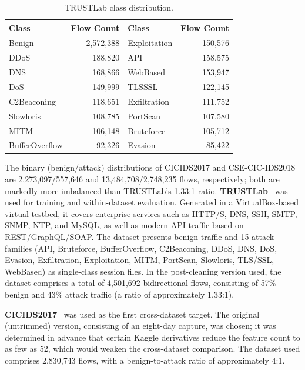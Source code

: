 \documentclass[a4paper,fleqn]{cas-sc}
\begin{document}
\begin{table}[width=.9\linewidth,cols=4,pos=htbp]
\caption{TRUSTLab class distribution.}
\label{tbl3}
\footnotesize
\begin{tabular*}{\tblwidth}{@{}LRLR@{}}
\toprule
\textbf{Class} & \textbf{Flow Count} & \textbf{Class} & \textbf{Flow Count} \\
\midrule
Benign & 2,572,388 & Exploitation & 150,576 \\
DDoS & 188,820 & API & 158,575 \\
DNS & 168,866 & WebBased & 153,947 \\
DoS & 149,999 & TLSSSL & 122,145 \\
C2Beaconing & 118,651 & Exfiltration & 111,752 \\
Slowloris & 108,785 & PortScan & 107,580 \\
MITM & 106,148 & Bruteforce & 105,712 \\
BufferOverflow & 92,326 & Evasion & 85,422 \\
\bottomrule
\end{tabular*}
\end{table}

The binary (benign/attack) distributions of CICIDS2017 and CSE-CIC-IDS2018 are 2,273,097/557,646 and 13,484,708/2,748,235 flows, respectively; both are markedly more imbalanced than TRUSTLab's 1.33:1 ratio. \textbf{TRUSTLab}~\cite{Villafranca2026} was used for training and within-dataset evaluation. Generated in a VirtualBox-based virtual testbed, it covers enterprise services such as HTTP/S, DNS, SSH, SMTP, SNMP, NTP, and MySQL, as well as modern API traffic based on REST/GraphQL/SOAP. The dataset presents benign traffic and 15 attack families (API, Bruteforce, BufferOverflow, C2Beaconing, DDoS, DNS, DoS, Evasion, Exfiltration, Exploitation, MITM, PortScan, Slowloris, TLS/SSL, WebBased) as single-class session files. In the post-cleaning version used, the dataset comprises a total of 4,501,692 bidirectional flows, consisting of 57\% benign and 43\% attack traffic (a ratio of approximately 1.33:1).

\textbf{CICIDS2017}~\cite{Sharafaldin2018} was used as the first cross-dataset target. The original (untrimmed) version, consisting of an eight-day capture, was chosen; it was determined in advance that certain Kaggle derivatives reduce the feature count to as few as 52, which would weaken the cross-dataset comparison. The dataset used comprises 2,830,743 flows, with a benign-to-attack ratio of approximately 4:1.
\end{document}
